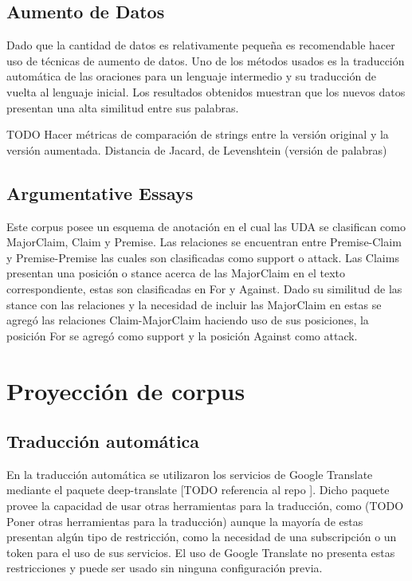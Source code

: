 \subsection{Aumento de Datos}

Dado que la cantidad de datos es relativamente pequeña es recomendable hacer uso de técnicas de 
aumento de datos. Uno de los métodos usados es la traducción automática de las oraciones para 
un lenguaje intermedio y su traducción de vuelta al lenguaje inicial. Los resultados obtenidos
muestran que los nuevos datos presentan una alta similitud entre sus palabras.

TODO Hacer métricas de comparación de strings entre la versión original y la versión aumentada.
Distancia de Jacard, de Levenshtein (versión de palabras)


\cite{feng2021data}

\subsection{Argumentative Essays}

Este corpus posee un esquema de anotación en el cual las UDA se clasifican como MajorClaim, Claim y 
Premise. Las relaciones se encuentran entre Premise-Claim y Premise-Premise las cuales son clasificadas
como support o attack. Las Claims presentan una posición o stance acerca de las MajorClaim en el 
texto correspondiente, estas son clasificadas en For y Against. Dado su similitud de las stance con
las relaciones y la necesidad de incluir las MajorClaim en estas se agregó las relaciones Claim-MajorClaim
haciendo uso de sus posiciones, la posición For se agregó como support y la posición Against como attack.

\section{Proyección de corpus}

\subsection{Traducción automática}

En la traducción automática se utilizaron los servicios de Google Translate mediante el paquete
deep-translate [TODO referencia al repo \cite{}]. Dicho paquete provee la capacidad de usar 
otras herramientas para la traducción, como (TODO Poner otras herramientas para la traducción)
aunque la mayoría de estas presentan algún tipo de restricción, como la necesidad de una subscripción
o un token para el uso de sus servicios. El uso de Google Translate no presenta estas restricciones
y puede ser usado sin ninguna configuración previa.

